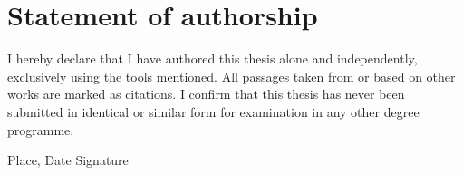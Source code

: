\documentclass[twoside,12pt,a4paper, parskip=full-]{report}
\begin{document}

\cleardoublepage


\cleardoublepage







\cleardoublepage


\printindex

\cleardoublepage

\thispagestyle{empty}
\section*{Statement of authorship}

I hereby declare that I have authored this thesis alone and independently, exclusively using the tools mentioned. All passages taken from or based on other works are marked as citations. I confirm that this thesis has never been submitted in identical or similar form for examination in any other degree programme.

\vskip 3cm

Place, Date	\hfill Signature \hfill 
\end{document}

